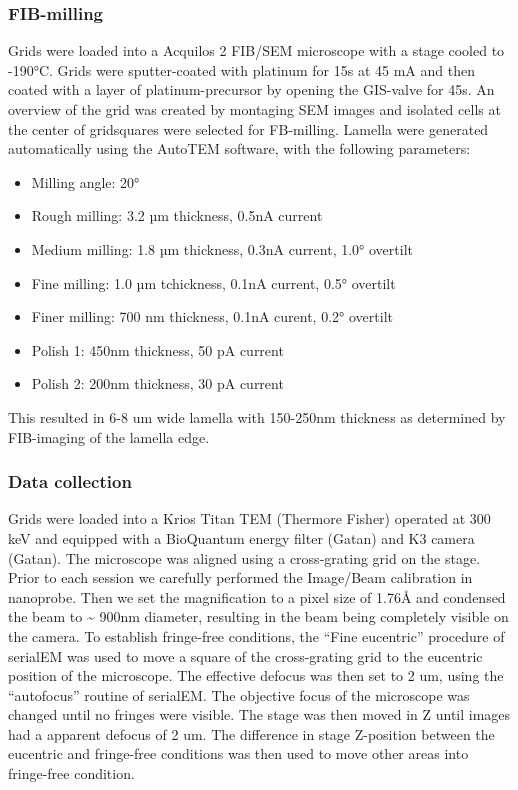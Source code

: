 \documentclass[
]{article}
\providecommand{\tightlist}{%
  \setlength{\itemsep}{0pt}\setlength{\parskip}{0pt}}
\begin{document}
\hypertarget{fib-milling}{%
\subsubsection{FIB-milling}\label{fib-milling}}

Grids were loaded into a Acquilos 2 FIB/SEM microscope with a stage cooled to
-190°C. Grids were sputter-coated with platinum for 15s at 45 mA and then coated
with a layer of platinum-precursor by opening the GIS-valve for 45s. An overview
of the grid was created by montaging SEM images and isolated cells at the center
of gridsquares were selected for FB-milling. Lamella were generated
automatically using the AutoTEM software, with the following parameters:

\begin{itemize}
\tightlist
\item
  Milling angle: 20°
\item
  Rough milling: 3.2 µm thickness, 0.5nA current
\item
  Medium milling: 1.8 µm thickness, 0.3nA current, 1.0° overtilt
\item
  Fine milling: 1.0 µm tchickness, 0.1nA current, 0.5° overtilt
\item
  Finer milling: 700 nm thickness, 0.1nA curent, 0.2° overtilt
\item
  Polish 1: 450nm thickness, 50 pA current
\item
  Polish 2: 200nm thickness, 30 pA current
\end{itemize}

This resulted in 6-8 um wide lamella with
150-250nm thickness as determined by FIB-imaging of the lamella edge.

\hypertarget{data-collection}{%
\subsubsection{Data collection}\label{data-collection}}

Grids were loaded into a Krios Titan TEM (Thermore Fisher) operated at 300 keV
and equipped with a BioQuantum energy filter (Gatan) and K3 camera (Gatan). The
microscope was aligned using a cross-grating grid on the stage. Prior to each
session we carefully performed the Image/Beam calibration in nanoprobe. Then we
set the magnification to a pixel size of 1.76Å and condensed the beam to \textasciitilde{}
900nm diameter, resulting in the beam being completely visible on the camera.
To establish fringe-free conditions, the ``Fine eucentric'' procedure of serialEM
was used to move a square of the cross-grating grid to the eucentric position of
the microscope. The effective defocus was then set to 2 um, using the
``autofocus'' routine of serialEM. The objective focus of the microscope was
changed until no fringes were visible. The stage was then moved in Z until
images had a apparent defocus of 2 um. The difference in stage Z-position
between the eucentric and fringe-free conditions was then used to move other
areas into fringe-free condition.
\end{document}
